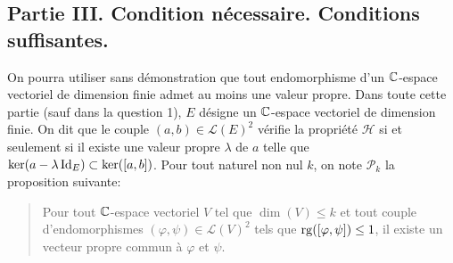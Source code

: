 \subsection*{Partie III. Condition nécessaire. Conditions suffisantes.}
On pourra utiliser sans démonstration que tout endomorphisme d'un $\mathbb{C}$-espace vectoriel de dimension finie admet au moins une valeur propre.\newline
Dans toute cette partie (sauf dans la question 1), $E$ désigne un $\mathbb{C}$-espace vectoriel de dimension finie.\newline
On dit que le couple $(a,b)\in\mathcal{L}(E)^2$ vérifie la propriété $\mathcal{H}$ si et seulement si il existe une valeur propre $\lambda$ de $a$ telle que $\ker(a-\lambda \operatorname{Id}_E)\subset\ker([a,b])$.\newline
Pour tout naturel non nul $k$, on note $\mathcal{P}_k$ la proposition suivante:
\begin{quotation}
 Pour tout $\mathbb{C}$-espace vectoriel $V$ tel que $\dim(V)\leq k$ et tout couple d'endomorphismes $(\varphi,\psi)\in\mathcal{L}(V)^2$ tels que $\operatorname{rg}([\varphi,\psi])\leq 1$, il existe un vecteur propre commun à $\varphi$ et $\psi$. 
\end{quotation}

